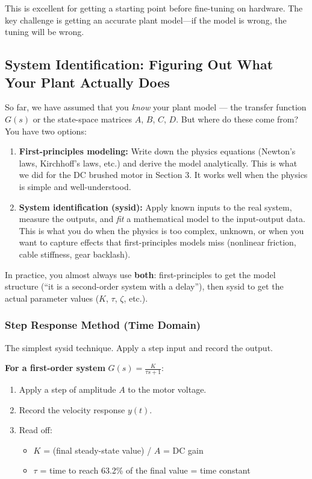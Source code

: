 This is excellent for getting a starting point before fine-tuning on hardware. The key challenge is getting an accurate plant model---if the model is wrong, the tuning will be wrong.

\subsection{System Identification: Figuring Out What Your Plant Actually Does}

So far, we have assumed that you \textit{know} your plant model --- the transfer function $G(s)$ or the state-space matrices $A$, $B$, $C$, $D$. But where do these come from? You have two options:

\begin{enumerate}
    \item \textbf{First-principles modeling:} Write down the physics equations (Newton's laws, Kirchhoff's laws, etc.) and derive the model analytically. This is what we did for the DC brushed motor in Section 3. It works well when the physics is simple and well-understood.
    \item \textbf{System identification (sysid):} Apply known inputs to the real system, measure the outputs, and \textit{fit} a mathematical model to the input-output data. This is what you do when the physics is too complex, unknown, or when you want to capture effects that first-principles models miss (nonlinear friction, cable stiffness, gear backlash).
\end{enumerate}

In practice, you almost always use \textbf{both}: first-principles to get the model structure (``it is a second-order system with a delay''), then sysid to get the actual parameter values ($K$, $\tau$, $\zeta$, etc.).

\subsubsection{Step Response Method (Time Domain)}

The simplest sysid technique. Apply a step input and record the output.

\textbf{For a first-order system} $G(s) = \frac{K}{\tau s + 1}$:
\begin{enumerate}
    \item Apply a step of amplitude $A$ to the motor voltage.
    \item Record the velocity response $y(t)$.
    \item Read off:
    \begin{itemize}[nosep]
        \item $K$ = (final steady-state value) / $A$ = DC gain
        \item $\tau$ = time to reach 63.2\% of the final value = time constant
    \end{itemize}
\end{enumerate}

